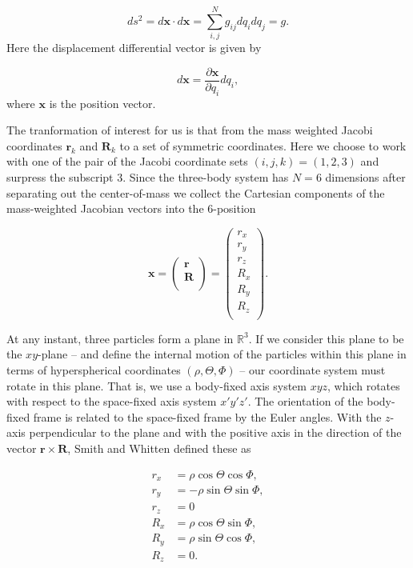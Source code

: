 \begin{equation}
d s^2 = d\mathbf{x} \cdot d\mathbf{x} = \sum_{i,j}^{N} g_{ij}  d q_{i} d q_{j} = g.
\end{equation}
Here the displacement differential vector is given by

\begin{equation}
d\mathbf{x} = \frac{\partial \mathbf{x}}{\partial q_{i}} d q_{i},
\end{equation} 
where $\mathbf{x}$ is the position vector.

The tranformation of interest for us is that from the mass weighted Jacobi coordinates $\mathbf{r}_k$ and $\mathbf{R}_k$ to a set of symmetric coordinates. Here we choose to work with one of the pair of the Jacobi coordinate sets $(i,j,k)=(1,2,3)$ and surpress the subscript $3$. Since the three-body system has $N=6$ dimensions after separating out the center-of-mass we collect the Cartesian components of the mass-weighted Jacobian vectors into the $6$-position

\begin{equation}
\mathbf{x} = 
\begin{pmatrix} 
\mathbf{r} \\
\mathbf{R} \\
\end{pmatrix} = 
\begin{pmatrix}
r_x \\
r_y \\
r_z \\
R_x \\
R_y \\
R_z\\
\end{pmatrix}.
\end{equation}

At any instant, three particles form a plane in $\mathbb{R}^3$. If we consider this plane to be the $xy$-plane -- and define the internal motion of the particles within this plane in terms of hyperspherical coordinates $(\rho, \Theta, \Phi)$ -- our coordinate system must rotate in this plane. That is, we use a body-fixed axis system $xyz$, which rotates with respect to the space-fixed axis system $x'y'z'$. The orientation of the body-fixed frame is related to the space-fixed frame by the Euler angles. With the $z$-axis perpendicular to the plane and with the positive axis in the direction of the vector $\mathbf{r} \times \mathbf{R}$, Smith and Whitten \cite{Smith_Whitten1968} defined these as   

\begin{equation}
\begin{aligned}
r_x &= \rho \cos\Theta\cos\Phi,\\
r_y &= -\rho \sin\Theta\sin\Phi,\\
r_z &= 0\\
R_x &= \rho \cos\Theta\sin\Phi,\\
R_y &= \rho \sin\Theta\cos\Phi,\\
R_z &= 0.
\end{aligned}   
\end{equation}


